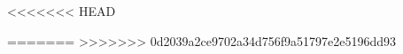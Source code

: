 \documentclass[11pt]{article}
\begin{document}
%



<<<<<<< HEAD



=======
>>>>>>> 0d2039a2ce9702a34d756f9a51797e2e5196dd93

{}

\end{document}
